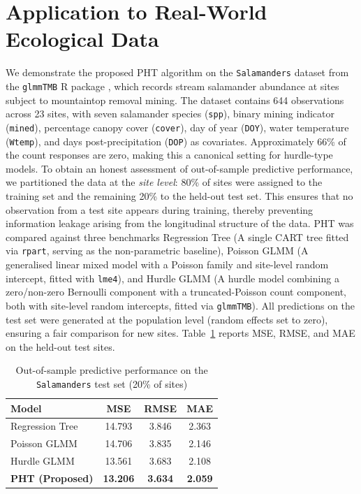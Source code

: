 \documentclass[twoside]{article}
\begin{document}
\section{Application to Real-World Ecological Data}
We demonstrate the proposed PHT algorithm on the \texttt{Salamanders} dataset
from the \texttt{glmmTMB} R package \citep{Brooks2017}, which records stream
salamander abundance at sites subject to mountaintop removal mining. The dataset
contains 644 observations across 23 sites, with seven salamander species
(\texttt{spp}), binary mining indicator (\texttt{mined}), percentage canopy
cover (\texttt{cover}), day of year (\texttt{DOY}), water temperature
(\texttt{Wtemp}), and days post-precipitation (\texttt{DOP}) as covariates.
Approximately 66\% of the count responses are zero, making this a canonical
setting for hurdle-type models. To obtain an honest assessment of out-of-sample predictive performance, we
partitioned the data at the \emph{site level}: 80\% of sites were assigned to
the training set and the remaining 20\% to the held-out test set.
This ensures that no observation from a test site appears during training,
thereby preventing information leakage arising from the longitudinal structure
of the data. PHT was compared against three benchmarks Regression Tree (A single CART tree fitted via
\texttt{rpart}, serving as the non-parametric baseline), Poisson GLMM (A generalised linear mixed model with a Poisson family and site-level random intercept, fitted with
\texttt{lme4}), and Hurdle GLMM (A hurdle model combining a zero/non-zero
Bernoulli component with a truncated-Poisson count component, both
with site-level random intercepts, fitted via \texttt{glmmTMB}). All predictions on the test set were generated at the population level (random effects set to zero), ensuring a fair comparison for new sites. Table~\ref{tab:salamander_results} reports MSE, RMSE, and MAE on the held-out test sites.
\begin{table}[ht]
	\centering
	\caption{Out-of-sample predictive performance on the \texttt{Salamanders}
		test set (20\% of sites)}
	\label{tab:salamander_results}
	\begin{tabular}{lccc}
		\hline
		\textbf{Model} & \textbf{MSE} & \textbf{RMSE} & \textbf{MAE} \\
		\hline
		Regression Tree  & 14.793 & 3.846 & 2.363 \\
		Poisson GLMM     & 14.706 & 3.835 & 2.146 \\
		Hurdle GLMM      & 13.561 & 3.683 & 2.108 \\
		\textbf{PHT (Proposed)} & \textbf{13.206} & \textbf{3.634} & \textbf{2.059} \\
		\hline
	\end{tabular}
\end{table}
\end{document}
